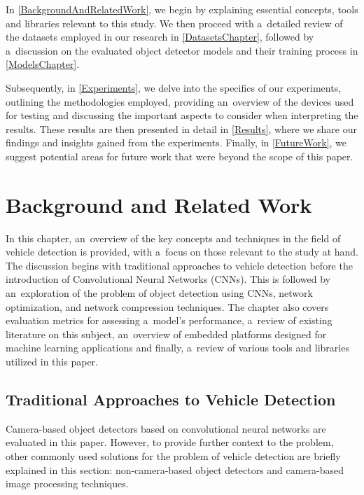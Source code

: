 In \autoref{BackgroundAndRelatedWork}, we begin by explaining essential
concepts, tools and libraries relevant to this study. We then proceed with
a~detailed review of the datasets employed in our research in
\autoref{DatasetsChapter}, followed by a~discussion on the evaluated object
detector models and their training process in \autoref{ModelsChapter}.

Subsequently, in \autoref{Experiments}, we delve into the specifics of our
experiments, outlining the methodologies employed, providing an~overview of the
devices used for testing and discussing the important aspects to consider when
interpreting the results. These results are then presented in detail in
\autoref{Results}, where we share our findings and insights gained from the
experiments. Finally, in \autoref{FutureWork}, we suggest potential areas for
future work that were beyond the scope of this paper.


\chapter{Background and Related Work}
\label{BackgroundAndRelatedWork}


In this chapter, an~overview of the key concepts and techniques in the field of
vehicle detection is provided, with a~focus on those relevant to the study at
hand. The discussion begins with traditional approaches to vehicle detection
before the introduction of Convolutional Neural Networks (CNNs). This is
followed by an~exploration of the problem of object detection using CNNs,
network optimization, and network compression techniques. The chapter also
covers evaluation metrics for assessing a~model's performance, a~review of
existing literature on this subject, an~overview of embedded platforms
designed for machine learning applications and finally, a~review of various
tools and libraries utilized in this paper.


\section{Traditional Approaches to Vehicle Detection}

Camera-based object detectors based on convolutional neural networks are
evaluated in this paper. However, to provide further context to the problem,
other commonly used solutions for the problem of vehicle detection are briefly
explained in this section: non-camera-based object detectors and
camera-based image processing techniques.


